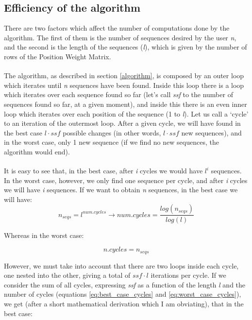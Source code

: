 \documentclass{article}
\begin{document}
\newpage


\subsection{Efficiency of the algorithm} \label{efficiency}

There are two factors which affect the number of computations done by the algorithm. The first of them is the number of sequences desired by the user \emph{n}, and the second is the length of the sequences (\emph{l}), which is given by the number of rows of the Position Weight Matrix.\\
\\
The algorithm, as described in section \ref{algorithm}, is composed by an outer loop which iterates until \emph{n} sequences have been found. Inside this loop there is a loop which iterates over each sequence found so far (let's call \emph{ssf} to the number of sequences found so far, at a given moment), and inside this there is an even inner loop which iterates over each position of the sequence (1 to \emph{l}). Let us call a `cycle' to an iteration of the outermost loop. After a given cycle, we will have found in the best case \(l \cdot ssf\) possible changes (in other words, \(l \cdot ssf\) new sequences), and in the worst case, only 1 new sequence (if we find no new sequences, the algorithm would end).\\
\\
It is easy to see that, in the best case, after \emph{i} cycles we would have \(l^i\) sequences. In the worst case, however, we only find one sequence per cycle, and after \emph{i} cycles we will have \emph{i} sequences. If we want to obtain \emph{n} sequences, in the best case we will have:\\

\begin{equation} \label{eq:best_case_cycles}
  n_{seqs} = l^{num.cycles} \rightarrow num.cycles = \frac{log(n_{seqs})}{log(l)}
\end{equation}

Whereas in the worst case:

\begin{equation} \label{eq:worst_case_cycles}
  n.cycles = n_{seqs}
\end{equation}

However, we must take into account that there are two loops inside each cycle, one nested into the other, giving a total of \(ssf \cdot l\) iterations per cycle. If we consider the sum of all cycles, expressing \emph{ssf} as a function of the length \emph{l} and the number of cycles (equations \ref{eq:best_case_cycles} and \ref{eq:worst_case_cycles}), we get (after a short mathematical derivation which I am obviating), that in the best case:
\end{document}
